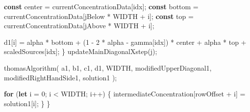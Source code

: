 \documentclass[
  letterpaper,
  DIV=11,
  numbers=noendperiod]{scrreprt}
\newenvironment{Shaded}{\begin{snugshade}}{\end{snugshade}}
\newcommand{\ControlFlowTok}[1]{\textcolor[rgb]{0.00,0.23,0.31}{\textbf{#1}}}
\newcommand{\DecValTok}[1]{\textcolor[rgb]{0.68,0.00,0.00}{#1}}
\newcommand{\FunctionTok}[1]{\textcolor[rgb]{0.28,0.35,0.67}{#1}}
\newcommand{\KeywordTok}[1]{\textcolor[rgb]{0.00,0.23,0.31}{\textbf{#1}}}
\newcommand{\NormalTok}[1]{\textcolor[rgb]{0.00,0.23,0.31}{#1}}
\newcommand{\OperatorTok}[1]{\textcolor[rgb]{0.37,0.37,0.37}{#1}}
\begin{document}
\begin{Shaded}
\begin{Highlighting}[]
                \KeywordTok{const}\NormalTok{ center }\OperatorTok{=}\NormalTok{ currentConcentrationData[idx]}\OperatorTok{;}
                \KeywordTok{const}\NormalTok{ bottom }\OperatorTok{=}\NormalTok{ currentConcentrationData[jBelow }\OperatorTok{*}\NormalTok{ WIDTH }\OperatorTok{+}\NormalTok{ i]}\OperatorTok{;}
                \KeywordTok{const}\NormalTok{ top }\OperatorTok{=}\NormalTok{ currentConcentrationData[jAbove }\OperatorTok{*}\NormalTok{ WIDTH }\OperatorTok{+}\NormalTok{ i]}\OperatorTok{;}

\NormalTok{                d1[i] }\OperatorTok{=}
\NormalTok{                    alpha }\OperatorTok{*}\NormalTok{ bottom }\OperatorTok{+}
\NormalTok{                    (}\DecValTok{1} \OperatorTok{{-}} \DecValTok{2} \OperatorTok{*}\NormalTok{ alpha }\OperatorTok{{-}}\NormalTok{ gamma[idx]) }\OperatorTok{*}\NormalTok{ center }\OperatorTok{+}
\NormalTok{                    alpha }\OperatorTok{*}\NormalTok{ top }\OperatorTok{+}
\NormalTok{                    scaledSources[idx]}\OperatorTok{;}
\NormalTok{            \}}
            \FunctionTok{updateMainDiagonalXstep}\NormalTok{(j)}\OperatorTok{;}

            \FunctionTok{thomasAlgorithm}\NormalTok{(}
\NormalTok{                a1}\OperatorTok{,}
\NormalTok{                b1}\OperatorTok{,}
\NormalTok{                c1}\OperatorTok{,}
\NormalTok{                d1}\OperatorTok{,}
\NormalTok{                WIDTH}\OperatorTok{,}
\NormalTok{                modifiedUpperDiagonal1}\OperatorTok{,}
\NormalTok{                modifiedRightHandSide1}\OperatorTok{,}
\NormalTok{                solution1}
\NormalTok{            )}\OperatorTok{;}

            \ControlFlowTok{for}\NormalTok{ (}\KeywordTok{let}\NormalTok{ i }\OperatorTok{=} \DecValTok{0}\OperatorTok{;}\NormalTok{ i }\OperatorTok{\textless{}}\NormalTok{ WIDTH}\OperatorTok{;}\NormalTok{ i}\OperatorTok{++}\NormalTok{) \{}
\NormalTok{                intermediateConcentration[rowOffset }\OperatorTok{+}\NormalTok{ i] }\OperatorTok{=}\NormalTok{ solution1[i]}\OperatorTok{;}
\NormalTok{            \}}
\NormalTok{        \}}


\end{Highlighting}
\end{Shaded}
\end{document}
